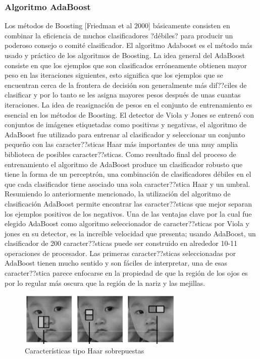    \subsubsection{Algoritmo AdaBoost}
   Los métodos de Boosting [Friedman et al 2000] básicamente consisten en combinar la eficiencia de muchos clasificadores ?débiles? para producir un poderoso consejo o comité clasificador. El algoritmo Adaboost es el método más usado y práctico de los algoritmos de Boosting. La idea general del AdaBoost consiste en que los ejemplos que son clasificados erróneamente obtienen mayor peso en las iteraciones siguientes, esto significa que los ejemplos que se encuentran cerca de la frontera de decisión son generalmente más dif??ciles de clasificar y por lo tanto se les asigna mayores pesos después de unas cuantas iteraciones. La idea de reasignación de pesos en el conjunto de entrenamiento es esencial en los métodos de Boosting.
   El detector de Viola y Jones se entrenó con conjuntos de imágenes etiquetadas como positivas y negativas, el algoritmo de AdaBoost fue utilizado para entrenar al clasificador y seleccionar un conjunto pequeño con las caracter??sticas Haar más importantes de una muy amplia biblioteca de posibles caracter??sticas. Como resultado final del proceso de entrenamiento el algoritmo de AdaBoost produce un clasificador robusto que tiene la forma de un perceptrón, una combinación de clasificadores débiles en el que cada clasificador tiene asociado una sola caracter??stica Haar y un umbral. Resumiendo lo anteriormente mencionado, la utilización del algoritmo de clasificación AdaBoost permite encontrar las caracter??sticas que mejor separan los ejemplos positivos de los negativos. Una de las ventajas clave por la cual fue elegido AdaBoost como algoritmo seleccionador de caracter??sticas por Viola y jones en su detector, es la increíble velocidad que presenta; usando AdaBoost, un clasificador de 200 caracter??sticas puede ser construido en alrededor 10-11 operaciones de procesador. Las primeras caracter??sticas seleccionadas por AdaBoost tienen mucho sentido y son fáciles de interpretar, una de esas caracter??stica parece enfocarse en la propiedad de que la región de los ojos es por lo regular más oscura que la región de la nariz y las mejillas.
   \begin{figure}[htbp]
   	\centering
   	\includegraphics[width=0.7\textwidth]{./pictures/adaboost}
   	\caption{Características tipo Haar sobrepuestas}\label{fig: figura}
   \end{figure}
   

